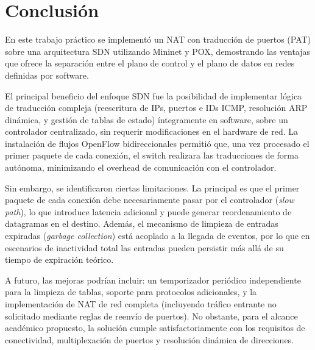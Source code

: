 \documentclass[11pt, a4paper]{article}
\begin{document}



\section{Conclusión}
\label{sec:conclusion}

En este trabajo práctico se implementó un NAT con traducción de puertos (PAT) sobre una arquitectura SDN utilizando Mininet y POX, demostrando las ventajas que ofrece la separación entre el plano de control y el plano de datos en redes definidas por software.

El principal beneficio del enfoque SDN fue la posibilidad de implementar lógica de traducción compleja (reescritura de IPs, puertos e IDs ICMP, resolución ARP dinámica, y gestión de tablas de estado) íntegramente en software, sobre un controlador centralizado, sin requerir modificaciones en el hardware de red. La instalación de flujos OpenFlow bidireccionales permitió que, una vez procesado el primer paquete de cada conexión, el switch realizara las traducciones de forma autónoma, minimizando el overhead de comunicación con el controlador.

Sin embargo, se identificaron ciertas limitaciones. La principal es que el primer paquete de cada conexión debe necesariamente pasar por el controlador (\textit{slow path}), lo que introduce latencia adicional y puede generar reordenamiento de datagramas en el destino. Además, el mecanismo de limpieza de entradas expiradas (\textit{garbage collection}) está acoplado a la llegada de eventos, por lo que en escenarios de inactividad total las entradas pueden persistir más allá de su tiempo de expiración teórico.

A futuro, las mejoras podrían incluir: un temporizador periódico independiente para la limpieza de tablas, soporte para protocolos adicionales, y la implementación de NAT de red completa (incluyendo tráfico entrante no solicitado mediante reglas de reenvío de puertos). No obstante, para el alcance académico propuesto, la solución cumple satisfactoriamente con los requisitos de conectividad, multiplexación de puertos y resolución dinámica de direcciones.
\end{document}
